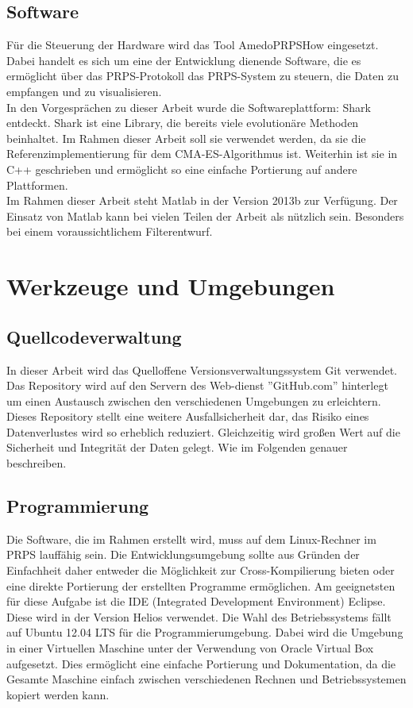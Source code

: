 \documentclass[a4paper,12pt,fleqn]{article}
\begin{document}
\subsection{Software}
Für die Steuerung der Hardware wird das Tool AmedoPRPSHow eingesetzt. Dabei handelt es sich um eine der Entwicklung dienende Software, die es ermöglicht über das PRPS-Protokoll das PRPS-System zu steuern, die Daten zu empfangen und zu visualisieren.\\
In den Vorgesprächen zu dieser Arbeit wurde die Softwareplattform: Shark entdeckt. Shark ist eine Library, die bereits viele evolutionäre Methoden beinhaltet. Im Rahmen dieser Arbeit soll sie verwendet werden, da sie die Referenzimplementierung für dem CMA-ES-Algorithmus ist. Weiterhin ist sie in C++ geschrieben und ermöglicht so eine einfache Portierung auf andere Plattformen.\\
Im Rahmen dieser Arbeit steht Matlab in der Version 2013b zur Verfügung. Der Einsatz von Matlab kann bei vielen Teilen der Arbeit als nützlich sein. Besonders bei einem voraussichtlichem Filterentwurf.  
%
\section{Werkzeuge und Umgebungen}
\subsection{Quellcodeverwaltung}
In dieser Arbeit wird das Quelloffene Versionsverwaltungssystem Git verwendet.
Das Repository wird auf den Servern des Web-dienst ''GitHub.com'' hinterlegt um
einen Austausch zwischen den verschiedenen Umgebungen zu erleichtern. Dieses
Repository stellt eine weitere Ausfallsicherheit dar, das Risiko eines
Datenverlustes wird so erheblich reduziert. Gleichzeitig wird großen Wert auf
die Sicherheit und Integrität der Daten gelegt. Wie im Folgenden
genauer beschreiben.
%
\subsection{Programmierung}
Die Software, die im Rahmen erstellt wird, muss auf dem Linux-Rechner im PRPS lauffähig sein. Die Entwicklungsumgebung sollte aus Gründen der Einfachheit daher entweder die Möglichkeit zur Cross-Kompilierung bieten oder eine direkte Portierung der erstellten Programme ermöglichen. Am geeignetsten für diese Aufgabe ist die IDE (Integrated Development Environment) Eclipse. Diese wird in der Version Helios verwendet. Die Wahl des Betriebssystems fällt auf Ubuntu 12.04 LTS für die Programmierumgebung. Dabei wird die Umgebung in einer Virtuellen Maschine unter der Verwendung von Oracle Virtual Box aufgesetzt. Dies ermöglicht eine einfache Portierung und Dokumentation, da die Gesamte Maschine einfach zwischen verschiedenen Rechnen und Betriebssystemen kopiert werden kann.
%
\end{document}
